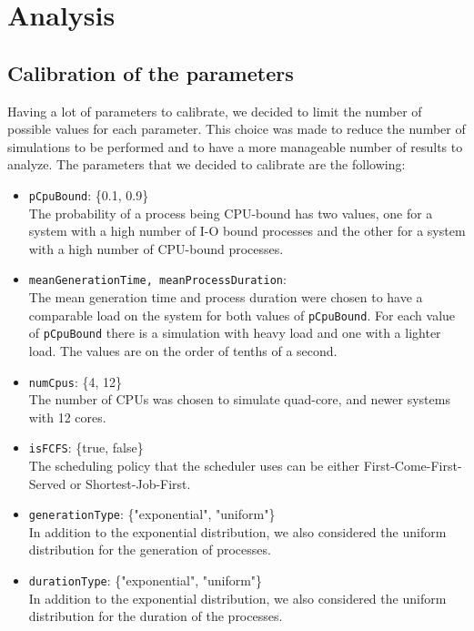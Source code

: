 \chapter{Analysis}

\section{Calibration of the parameters}

Having a lot of parameters to calibrate, we decided to limit the number of possible values for each parameter. This choice was made to reduce the number of simulations to be performed and to have a more manageable number of results to analyze. The parameters that we decided to calibrate are the following:

\begin{itemize}
    \item \texttt{pCpuBound}: \{0.1, 0.9\} \\
          The probability of a process being CPU-bound has two values, one for a system with a high number of I-O bound processes and the other for a system with a high number of CPU-bound processes.
    \item \texttt{meanGenerationTime, meanProcessDuration}:\\
          The mean generation time and process duration were chosen to have a comparable load on the system for both values of \texttt{pCpuBound}. For each value of \texttt{pCpuBound} there is a simulation with heavy load and one with a lighter load. The values are on the order of tenths of a second.
    \item \texttt{numCpus}: \{4, 12\} \\
          The number of CPUs was chosen to simulate quad-core, and newer systems with 12 cores.
    \item \texttt{isFCFS}: \{true, false\} \\
          The scheduling policy that the scheduler uses can be either First-Come-First-Served or Shortest-Job-First.
    \item \texttt{generationType}: \{"exponential", "uniform"\} \\
          In addition to the exponential distribution, we also considered the uniform distribution for the generation of processes.
    \item \texttt{durationType}: \{"exponential", "uniform"\} \\
          In addition to the exponential distribution, we also considered the uniform distribution for the duration of the processes.
\end{itemize}


